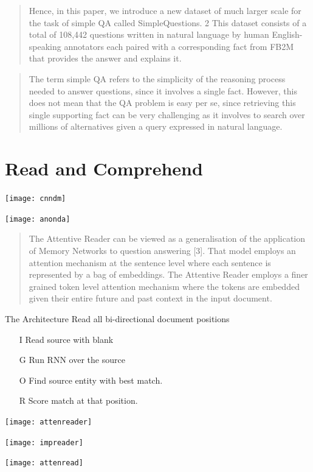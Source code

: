 \documentclass{beamer}
\begin{document}
\begin{frame}
  \begin{quote}
    Hence, in this paper, we introduce a new dataset of much larger
    scale for the task of simple QA called SimpleQuestions.  2 This
    dataset consists of a total of 108,442 questions written in
    natural language by human English-speaking annotators each paired
    with a corresponding fact from FB2M that provides the answer and
    explains it.
  \end{quote}
\end{frame}



\begin{frame}
  \begin{quote}
    The term simple QA refers to the simplicity of
the reasoning process needed to answer questions,
since it involves a single fact. However, this does
not mean that the QA problem is easy per se, since
retrieving this single supporting fact can be very
challenging as it involves to search over millions
of alternatives given a query expressed in natural
language.
  \end{quote}
\end{frame}


\section{Read and Comprehend}
\begin{frame}
  \texttt{[image: cnndm]}
\end{frame}


\begin{frame}
  \texttt{[image: anonda]}
\end{frame}

\begin{frame}
  \begin{quote}
    The Attentive Reader can be viewed as a generalisation of the application of Memory Networks to
question answering [3]. That model employs an attention mechanism at the sentence level where
each sentence is represented by a bag of embeddings. The Attentive Reader employs a finer grained
token level attention mechanism where the tokens are embedded given their entire future and past
context in the input document.
  \end{quote}
\end{frame}

\begin{frame}{The Architecture}
  Read all bi-directional document positions 
  \begin{itemize}
  \item[I] Read source with blank
  \item[G] Run RNN over the source
  \item[O] Find source entity with best match.
  \item[R] Score match at that position.
  \end{itemize}
\end{frame}


\begin{frame}
  \texttt{[image: attenreader]}
\end{frame}


\begin{frame}
  \texttt{[image: impreader]}
\end{frame}


\begin{frame}
  \texttt{[image: attenread]}
\end{frame}
\end{document}
